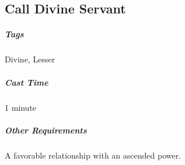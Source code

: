 











\subsection{Call Divine Servant}
\subparagraph*{Tags} Divine, Lesser
\subparagraph*{Cast Time} 1 minute
\subparagraph*{Other Requirements} A favorable relationship with an ascended power.

